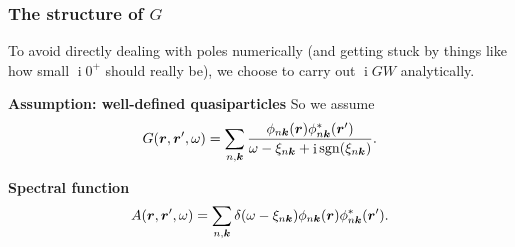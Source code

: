 \documentclass[t]{beamer}
\DeclareMathOperator{\ii}{i}
\DeclareMathOperator{\sgn}{sgn}
\begin{document}
\begin{frame}
\frametitle{The structure of $G$}

To avoid directly dealing with poles numerically 
(and getting stuck by things like how small $\ii 0^+$ should really be), 
we choose to carry out $\ii GW$ analytically. 

\textbf{Assumption: well-defined quasiparticles} So we assume 
\begin{equation}
    G(\vb*{r}, \vb*{r}', \omega) 
    = \sum_{n, \vb*{k}} \frac{
        \phi_{n \vb*{k}}(\vb*{r}) \phi_{n \vb*{k}}^*(\vb*{r}')
    }{
        \omega - \xi_{n \vb*{k}} + \ii \sgn(\xi_{n \vb*{k}})
    }.
    \label{eq:g-rep}
\end{equation}

\textbf{Spectral function} \begin{equation}
    A(\vb*{r}, \vb*{r}', \omega)
    = \sum_{n, \vb*{k}} \delta(\omega - \xi_{n \vb*{k}})
    \phi_{n \vb*{k}}(\vb*{r}) \phi^*_{n \vb*{k}}(\vb*{r}').
\end{equation}


\end{frame}
\end{document}
